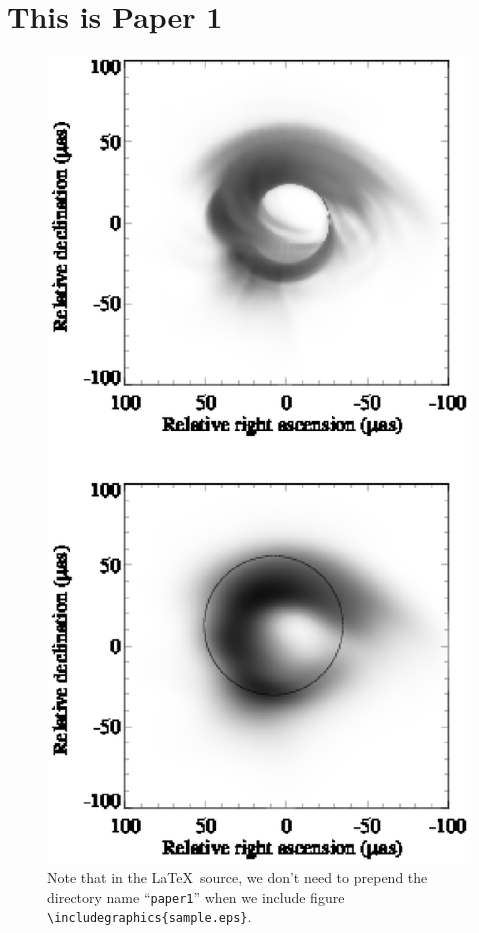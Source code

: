 \chapter{This is Paper 1}

\begin{figure}
  \includegraphics{sample.eps}
  \caption{Note that in the \LaTeX\ source, we don't need to prepend
    the directory name ``\texttt{paper1}'' when we include figure
    \texttt{\textbackslash includegraphics\{sample.eps\}}.}
\end{figure}

